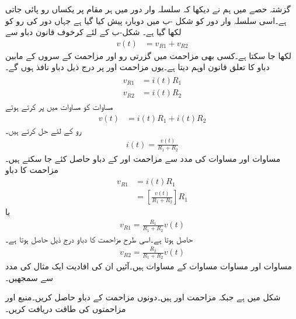 گزشتہ حصے میں ہم نے دیکھا کہ سلسلہ وار دور میں ہر مقام پر یکساں رو پائی جاتی ہے۔اسی سلسلہ وار دور کو شکل -ب میں دوبارہ پیش کیا گیا ہے جہاں دور کی رو کو  لکھا گیا ہے۔ شکل-ب کے لئے کرخوف قانون دباو سے
\begin{align}\label{مساوات_مزاحمتی_تقسیم_دباو_الف}
v(t)&=v_{R1}+v_{R2}
\end{align}
لکھا جا سکتا ہے۔کسی بھی مزاحمت میں گزرتی رو اور مزاحمت کے سروں کے مابین دباو کا تعلق قانون اوہم دیتا ہے۔یوں مزاحمت  اور  پر درج ذیل دباو نافذ ہوں گے۔
\begin{gather}
\begin{aligned}\label{مساوات_مزاحمتی_تقسیم_دباو_ب}
v_{R1}&=i(t) R_1 \\
v_{R2}&=i(t) R_2
\end{aligned}
\end{gather}
مساوات  کو مساوات  میں پر کرتے ہوئے
\begin{align}
v(t)&=i(t) R_1+i(t) R_2
\end{align}
رو کے لئے حل کرتے ہیں۔
\begin{align}\label{مساوات_مزاحمتی_تقسیم_دباو_ت}
i(t)=\frac{v(t)}{R_1+R_2}
\end{align}
مساوات  اور مساوات  کی مدد سے مزاحمت  اور  کے دباو حاصل کئے جا سکتے ہیں۔مزاحمت  کا دباو
\begin{align*}
v_{R1}&=i(t) R_1\\
&=\left[\frac{v(t)}{R_1+R_2}\right] R_1
\end{align*}
یا
\begin{align}\label{مساوات_مزاحمتی_تقسیم_دباو_ٹ}
v_{R1}=\frac{R_1}{R_1+R_2} v(t)
\end{align}
حاصل ہوتا ہے۔اسی طرح مزاحمت  کا دباو درج ذیل حاصل ہوتا ہے۔
\begin{align}\label{مساوات_مزاحمتی_تقسیم_دباو_ث}
v_{R2}=\frac{R_2}{R_1+R_2} v(t)
\end{align}
مساوات  اور مساوات مساوات   کے مساوات ہیں۔آئیں ان کی افادیت ایک مثال کی مدد سے سمجھیں۔

شکل  میں  ہے جبکہ مزاحمت  اور  ہیں۔دونوں مزاحمت کے دباو حاصل کریں۔منبع اور مزاحمتوں کی طاقت دریافت کریں۔

